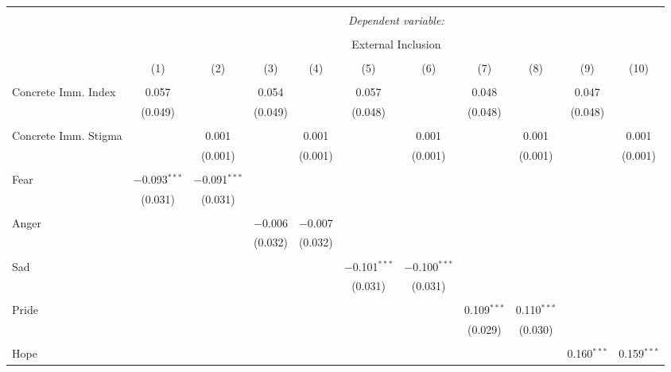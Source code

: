 
\begin{table}[!htbp] \centering 
  \caption{} 
  \label{} 
\begin{tabular}{@{\extracolsep{5pt}}lcccccccccc} 
\\[-1.8ex]\hline 
\hline \\[-1.8ex] 
 & \multicolumn{10}{c}{\textit{Dependent variable:}} \\ 
\cline{2-11} 
\\[-1.8ex] & \multicolumn{10}{c}{External Inclusion} \\ 
\\[-1.8ex] & (1) & (2) & (3) & (4) & (5) & (6) & (7) & (8) & (9) & (10)\\ 
\hline \\[-1.8ex] 
 Concrete Imm. Index & 0.057 &  & 0.054 &  & 0.057 &  & 0.048 &  & 0.047 &  \\ 
  & (0.049) &  & (0.049) &  & (0.048) &  & (0.048) &  & (0.048) &  \\ 
  & & & & & & & & & & \\ 
 Concrete Imm. Stigma &  & 0.001 &  & 0.001 &  & 0.001 &  & 0.001 &  & 0.001 \\ 
  &  & (0.001) &  & (0.001) &  & (0.001) &  & (0.001) &  & (0.001) \\ 
  & & & & & & & & & & \\ 
 Fear & $-$0.093$^{***}$ & $-$0.091$^{***}$ &  &  &  &  &  &  &  &  \\ 
  & (0.031) & (0.031) &  &  &  &  &  &  &  &  \\ 
  & & & & & & & & & & \\ 
 Anger &  &  & $-$0.006 & $-$0.007 &  &  &  &  &  &  \\ 
  &  &  & (0.032) & (0.032) &  &  &  &  &  &  \\ 
  & & & & & & & & & & \\ 
 Sad &  &  &  &  & $-$0.101$^{***}$ & $-$0.100$^{***}$ &  &  &  &  \\ 
  &  &  &  &  & (0.031) & (0.031) &  &  &  &  \\ 
  & & & & & & & & & & \\ 
 Pride &  &  &  &  &  &  & 0.109$^{***}$ & 0.110$^{***}$ &  &  \\ 
  &  &  &  &  &  &  & (0.029) & (0.030) &  &  \\ 
  & & & & & & & & & & \\ 
 Hope &  &  &  &  &  &  &  &  & 0.160$^{***}$ & 0.159$^{***}$ \\ 

\end{tabular}
\end{table}
